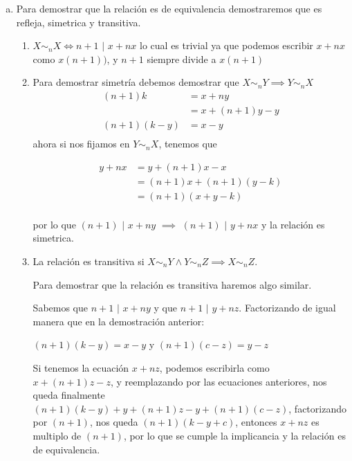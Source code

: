 
\begin{enumerate}[a)]
    \item Para demostrar que la relación es de equivalencia demostraremos que es refleja, simetrica y transitiva.
    
    \begin{enumerate}[1)]
        \item $X \sim_n X \iff n + 1$ $|$ $x + nx$ lo cual es trivial ya que podemos escribir $x + nx$ como $x (n+1))$, y $n + 1$ siempre divide a $x (n+1)$

        \item Para demostrar simetría debemos demostrar que $X \sim_n Y \implies Y \sim_n X$
        \begin{align*}
            (n+1)k &= x + ny \\
                   &= x + (n+1)y - y\\
            (n+1)(k-y) &= x - y\\
        \end{align*}
        ahora si nos fijamos en $Y \sim_n X$, tenemos que
        
        \begin{align*}
            y + nx &= y + (n+1)x - x \\
                   &= (n+1)x + (n+1)(y-k)\\
                   &= (n+1)(x + y - k)\\
        \end{align*}
        
        por lo que $(n+1)$ $|$ $x+ny$ $\implies$ $(n+1)$ $|$ $y + nx$ y la relación es simetrica.
        
        \item La relación es transitiva si $X \sim_n Y \land Y \sim_n Z \implies X \sim_n Z$.
        
        Para demostrar que la relación es transitiva haremos algo similar.
        
        Sabemos que $n+1$ $|$ $x + ny$ y que $n+1$ $|$ $y + nz$. Factorizando de igual manera que en la demostración anterior:
        
        \hspace{10mm} $(n+1)(k - y) = x - y$ y $(n+1)(c - z) = y - z$
        
        Si tenemos la ecuación $x + nz$, podemos escribirla como $x + (n+1)z - z$, y reemplazando por las ecuaciones anteriores, nos queda finalmente 
        $(n+1)(k - y) + y + (n+1)z - y + (n+1)(c - z)$, factorizando por $(n + 1)$, nos queda $(n+1)(k - y + c)$, entonces $x + nz$ es multiplo de $(n+1)$, por lo que se cumple la implicancia y la relación es de equivalencia.
    \end{enumerate}
    

\end{enumerate}
